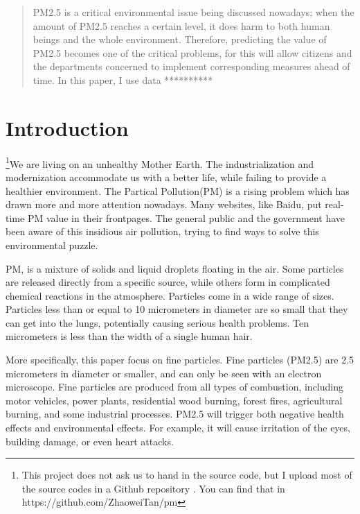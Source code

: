 \documentclass{sig-alternate}
\begin{document}
\date{5 July 2015}


\maketitle
\begin{abstract}
PM2.5 is a critical environmental issue being discussed nowadays; when the amount of PM2.5 reaches a certain level, it does harm to both human beings and the whole environment. Therefore, predicting the value of PM2.5 becomes one of the critical problems, for this will allow citizens and the departments concerned to implement corresponding measures ahead of time. In this paper, I use data **********
\end{abstract}




\section{Introduction}
\footnote{This project does not ask us to hand in the source code, but I upload most of the source codes in a Github repository . You can find that in https://github.com/ZhaoweiTan/pm}We are living on an unhealthy Mother Earth. The industrialization and modernization accommodate us with a better life, while failing to provide a healthier environment. The Partical Pollution(PM) is a rising problem which has drawn more and more attention nowadays. Many websites, like Baidu, put real-time PM value in their frontpages. The general public and the government have been aware of this insidious air pollution, trying to find ways to solve this environmental puzzle.

PM, is a mixture of solids and liquid droplets floating in the air\cite{pm}. Some particles are released directly from a specific source, while others form in complicated chemical reactions in the atmosphere. Particles come in a wide range of sizes. Particles less than or equal to 10 micrometers in diameter are so small that they can get into the lungs, potentially causing serious health problems. Ten micrometers is less than the width of a single human hair.

More specifically, this paper focus on fine particles. Fine particles (PM2.5) are 2.5 micrometers in diameter or smaller, and can only be seen with an electron microscope. Fine particles are produced from all types of combustion, including motor vehicles, power plants, residential wood burning, forest fires, agricultural burning, and some industrial processes. PM2.5 will trigger both negative health effects and environmental effects. For example, it will cause irritation of the eyes, building damage, or even heart attacks.
\end{document}
